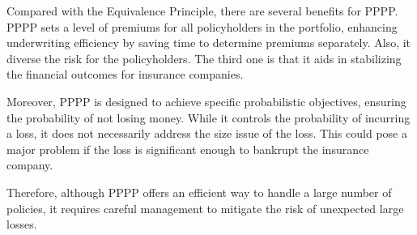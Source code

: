 \documentclass[
]{article}
\begin{document}
Compared with the Equivalence Principle, there are several benefits for
PPPP. PPPP sets a level of premiums for all policyholders in the
portfolio, enhancing underwriting efficiency by saving time to determine
premiums separately. Also, it diverse the risk for the policyholders.
The third one is that it aids in stabilizing the financial outcomes for
insurance companies.

Moreover, PPPP is designed to achieve specific probabilistic objectives,
ensuring the probability of not losing money. While it controls the
probability of incurring a loss, it does not necessarily address the
size issue of the loss. This could pose a major problem if the loss is
significant enough to bankrupt the insurance company.

Therefore, although PPPP offers an efficient way to handle a large
number of policies, it requires careful management to mitigate the risk
of unexpected large losses.
\end{document}
